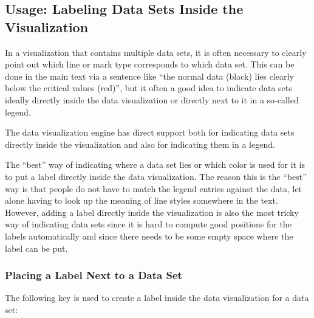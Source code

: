 \subsection{Usage: Labeling Data Sets Inside the Visualization}

In a visualization that contains multiple data sets, it is often necessary to
clearly point out which line or mark type corresponds to which data set. This
can be done in the main text via a sentence like ``the normal data (black) lies
clearly below the critical values (red)'', but it often a good idea to indicate
data sets ideally directly inside the data visualization or directly next to it
in a so-called legend.

The data visualization engine has direct support both for indicating data sets
directly inside the visualization and also for indicating them in a legend.

The ``best'' way of indicating where a data set lies or which color is used for
it is to put a label directly inside the data visualization. The reason this is
the ``best'' way is that people do not have to match the legend entries against
the data, let alone having to look up the meaning of line styles somewhere in
the text. However, adding a label directly inside the visualization is also the
most tricky way of indicating data sets since it is hard to compute good
positions for the labels automatically and since there needs to be some empty
space where the label can be put.


\subsubsection{Placing a Label Next to a Data Set}

The following key is used to create a label inside the data visualization for a
data set:

